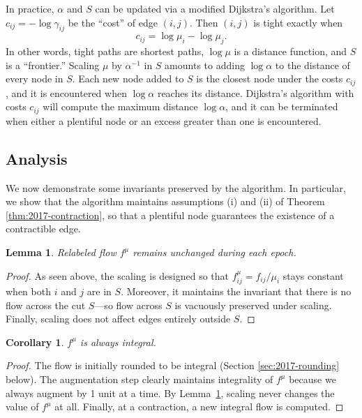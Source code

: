 \documentclass[11pt]{article}
\newtheorem{corollary}{Corollary}[theorem]
\newtheorem{lemma}[theorem]{Lemma}
\theoremstyle{definition}
\theoremstyle{definition}
\theoremstyle{definition}
\newcommand{\gij}{\gamma_{ij}}
\begin{document}
    In practice, $\alpha$ and $S$ can be updated via a modified Dijkstra's algorithm.
    Let $c_{ij} = - \log \gij$ be the ``cost'' of edge $(i, j)$.
    Then $(i, j)$ is tight exactly when
    \[ c_{ij} = \log \mu_i - \log \mu_j. \]
    In other words, tight paths are shortest paths, $\log \mu$ is a distance function,
    and $S$ is a ``frontier.'' Scaling $\mu$ by $\alpha^{-1}$ in $S$ amounts to adding
    $\log \alpha$ to the distance of every node in $S$. Each new node added to $S$
    is the closest node under the costs $c_{ij}$, and it is encountered when $\log \alpha$
    reaches its distance.
    Dijkstra's algorithm with costs $c_{ij}$ will compute the maximum distance $\log \alpha$,
    and it can be terminated when either a plentiful node or an excess greater than
    one is encountered.

	\subsection{Analysis}
	We now demonstrate some invariants preserved by the algorithm. In particular,
	we show that the algorithm maintains assumptions (i) and (ii) of
	Theorem \ref{thm:2017-contraction}, so that a plentiful node guarantees the
	existence of a contractible edge.
    \begin{lemma}
    Relabeled flow $f^{\mu}$ remains unchanged during each epoch.
    \label{lem:fsame}
    \end{lemma} 
    \begin{proof}
    	As seen above, the scaling is designed so that $f_{ij}^\mu = f_{ij}/\mu_i$
    	stays constant when both $i$ and $j$ are in $S$. Moreover, it maintains the
    	invariant that there is no flow across the cut $S$---so flow across $S$ is vacuously
    	preserved under scaling. Finally, scaling does not affect edges entirely
    	outside $S$.
    \end{proof}
    \begin{corollary}
    $f^{\mu}$ is always integral.
    \end{corollary}
    \begin{proof}
    The flow is initially rounded to be integral (Section \ref{sec:2017-rounding} below). 
    The augmentation step clearly maintains integrality of $f^{\mu}$ because we
    always augment by 1 unit at a time. By
    Lemma~\ref{lem:fsame}, scaling never changes the value of $f^{\mu}$ at all.
    Finally, at a contraction, a new integral flow is computed.
    \end{proof}
\end{document}
